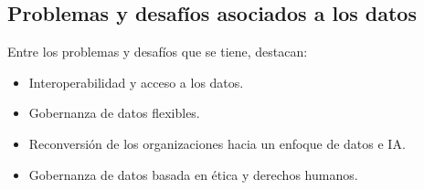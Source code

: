 \documentclass[10pt]{book}
\begin{document}
\begin{multicols}{2}
    \subsection*{Problemas y desafíos asociados a los datos}
    Entre los problemas y desafíos que se tiene, destacan:

    \begin{itemize}
	\item Interoperabilidad y acceso a los datos.
	\item Gobernanza de datos flexibles.
	\item Reconversión de los organizaciones hacia un enfoque de datos e IA.
	\item Gobernanza de datos basada en ética y derechos humanos.
    \end{itemize}

\end{multicols}
\end{document}
